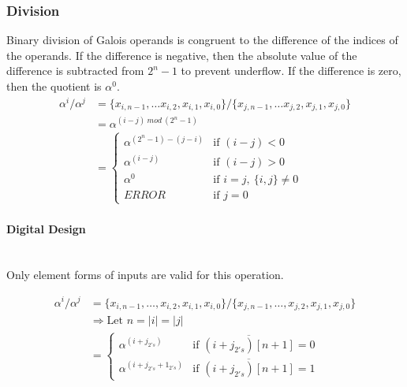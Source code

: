 \subsubsection{Division} Binary division of Galois operands is congruent to the
difference of the indices of the operands. If the difference is negative, then
the absolute value of the difference is subtracted from $2^{n}-1$ to prevent
underflow. If the difference is zero, then the quotient is $\alpha^{0}$.
    \begin{align*}
        \alpha^{i} / \alpha^{j} & = \{x_{i, n-1},\ldots x_{i, 2},x_{i,
        1},x_{i, 0}\} / \{x_{j, n-1}, \ldots x_{j, 2}, x_{j, 1}, x_{j, 0}\}
        \\
        & = \alpha^{(i - j) \ mod \ (2^{n}-1)} \\
        & = \begin{cases}
            \alpha^{(2^{n}-1) - (j - i)} & \text{if $(i - j) < 0$} \\
            \alpha^{(i - j)} & \text{if $(i - j) > 0$} \\
            \alpha^{0} & \text{if $i = j, \ \{i,j\} \neq 0$} \\
            ERROR & \text{if $j = 0$}
        \end{cases}
    \end{align*}

    \paragraph{{\small Digital Design}} \leavevmode \\ Only element forms of
    inputs are valid for this operation.

\begin{align*}
    \alpha^{i} / \alpha^{j} & = \{ x_{i, n-1}, \ldots, x_{i, 2}, x_{i, 1},
    x_{i, 0} \} / \{x_{j, n-1}, \ldots, x_{j, 2}, x_{j, 1}, x_{j, 0}\} \\
    & \Longrightarrow \text{Let } n = |i| = |j| \\
    & = \begin{cases}
            \alpha^{(i + j_{2's})} & \text{if $\overline{(i+j_{2's})[n+1]}=0$} \\
            \alpha^{(i + j_{2's} + 1_{2's})} & \text{if
            $\overline{(i+j_{2's})[n+1]}=1$}
        \end{cases}
\end{align*}
